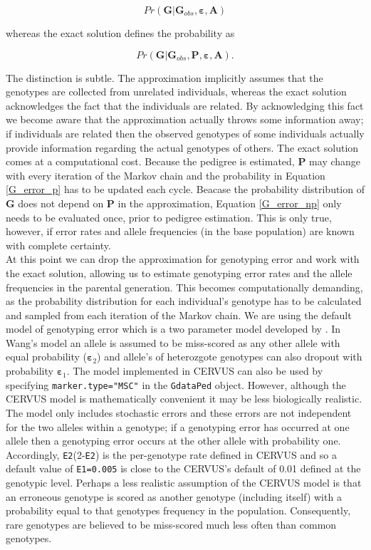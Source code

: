 \documentclass{article}
\begin{document}
\begin{equation}
Pr({\bm G} | {\bm G}_{obs}, {\bm \varepsilon}, {\bm A})
\label{G_error_np}
\end{equation}

whereas the exact solution defines the probability as

\begin{equation}
Pr({\bm G} | {\bm G}_{obs}, {\bm P}, {\bm \varepsilon}, {\bm A}).
\label{G_error_p}
\end{equation}

The distinction is subtle.  The approximation implicitly assumes that the genotypes are collected from unrelated individuals, whereas the exact solution acknowledges the fact that the individuals are related.  By acknowledging this fact we become aware that the approximation actually throws some information away; if individuals are related then the observed genotypes of some individuals actually provide information regarding the actual genotypes of others. The exact solution comes at a computational cost.  Because the pedigree is estimated, ${\bm P}$ may change with every iteration of the Markov chain and the probability in Equation \ref{G_error_p} has to be updated each cycle.  Beacase the probability distribution of $\bm{G}$ does not depend on $\bm{P}$ in the approximation, Equation \ref{G_error_np} only needs to be evaluated once, prior to pedigree estimation.  This is only true, however, if error rates and allele frequencies (in the base population) are known with complete certainty.\\


 At this point we can drop the approximation for genotyping error and work with the exact solution, allowing us to estimate genotyping error rates and the allele frequencies in the parental generation. This becomes computationally demanding, as the probability distribution for each individual's genotype has to be calculated and sampled from each iteration of the Markov chain. We are using the default model of genotyping error which is a two parameter model developed by \citet{Wang.2004}. In Wang's model an allele is assumed to be miss-scored as any other allele with equal probability (${\bm \varepsilon_{2}}$) and allele's of heterozgote genotypes can also dropout with probability ${\bm \varepsilon_{1}}$. The model implemented in CERVUS can also be used by specifying \texttt{marker.type="MSC"} in the \texttt{GdataPed} object. However, although the CERVUS model is mathematically convenient it may be less biologically realistic.  The model only includes stochastic errors and these errors are not independent for the two alleles within a genotype; if a genotyping error has occurred at one allele then a genotyping error occurs at the other allele with probability one. Accordingly, \texttt{E2}(2-\texttt{E2}) is the per-genotype rate defined in CERVUS and so a default value of \texttt{E1=0.005} is close to the CERVUS's default of 0.01 defined at the genotypic level. Perhaps a less realistic assumption of the CERVUS model is that an erroneous genotype is scored as another genotype (including itself) with a probability equal to that genotypes frequency in the population.  Consequently, rare genotypes are believed to be miss-scored much less often than common genotypes.
\end{document}
